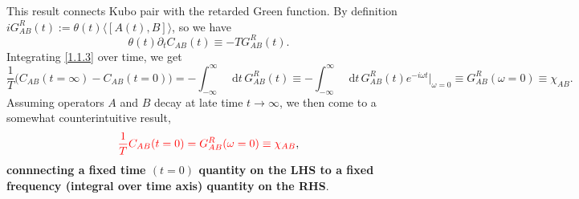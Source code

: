 \documentclass[10pt,nofootinbib,letterpaper]{revtex4}
\newcommand*\dd{\mathop{}\!\mathrm{d}}
\begin{document}
		This result connects Kubo pair with the retarded Green function. By definition $iG^R_{AB}(t):=\theta(t)\langle[A(t),B]\rangle$, so we have
		\begin{equation}\label{1.1.3}
			\theta(t)\partial_t C_{AB}(t)\equiv -T G_{AB}^R(t).
		\end{equation}
		Integrating \eqref{1.1.3} over time, we get
		\begin{equation*}
			\dfrac{1}{T}\bigg(C_{AB}(t=\infty)-C_{AB}(t=0)\bigg)=-\int_{-\infty}^\infty\dd t\, G^R_{AB}(t)\equiv-\int_{-\infty}^\infty\dd t\, G^R_{AB}(t)e^{-i\omega t}|_{\omega=0}\equiv G^R_{AB}(\omega=0)\equiv\chi_{AB}.
		\end{equation*}
		Assuming operators $A$ and $B$ decay at late time $t\rightarrow\infty$, we then come to a somewhat counterintuitive result,
		\begin{equation}\label{1.1.4}
			{\color{red}\dfrac{1}{T}C_{AB}(t=0)=G_{AB}^R(\omega=0)\equiv\chi_{AB}},
		\end{equation}
		\textbf{connnecting a fixed time $(t=0)$ quantity on the LHS to a fixed frequency (integral over time axis) quantity on the RHS}.
\end{document}
